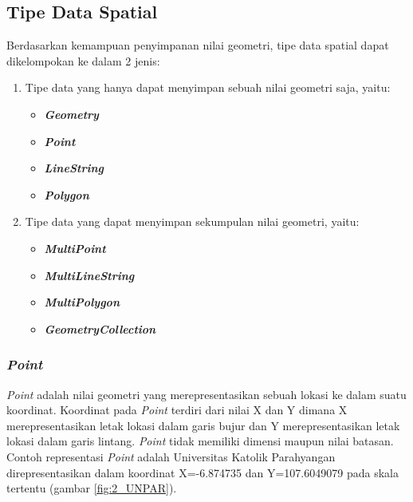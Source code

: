 \subsection{Tipe Data Spatial}
\label{sec:tipe_data_spatial}
Berdasarkan kemampuan penyimpanan nilai geometri\cite{spatialtipedata}, tipe data spatial dapat dikelompokan ke dalam 2 jenis:
\begin{enumerate}
	\item Tipe data yang hanya dapat menyimpan sebuah nilai geometri saja, yaitu:
	\begin{itemize}
		\item \textbf{\textit{Geometry}}
		\item \textbf{\textit{Point}}
		\item \textbf{\textit{LineString}}
		\item \textbf{\textit{Polygon}}
	\end{itemize}
	\item Tipe data yang dapat menyimpan sekumpulan nilai geometri, yaitu:
	\begin{itemize}
		\item \textbf{\textit{MultiPoint}}
		\item \textbf{\textit{MultiLineString}}
		\item \textbf{\textit{MultiPolygon}}
		\item \textbf{\textit{GeometryCollection}}
	\end{itemize}
\end{enumerate}

\subsubsection{\textit{Point}}
\label{sec:point}
\textit{Point} adalah nilai geometri yang merepresentasikan sebuah lokasi ke dalam suatu koordinat\cite{spatialtipedatapoint}. Koordinat pada \textit{Point} terdiri dari nilai X dan Y dimana X merepresentasikan letak lokasi dalam garis bujur dan Y merepresentasikan letak lokasi dalam garis lintang. \textit{Point} tidak memiliki dimensi maupun nilai batasan. Contoh representasi \textit{Point} adalah Universitas Katolik Parahyangan direpresentasikan dalam koordinat X=-6.874735 dan Y=107.6049079 pada skala tertentu (gambar \ref{fig:2_UNPAR}).

